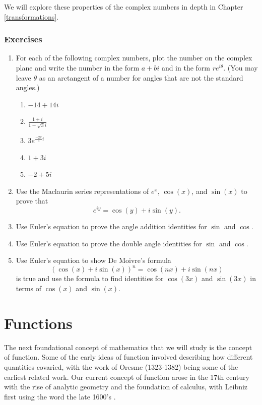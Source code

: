 \documentclass[
]{book}
\theoremstyle{definition}
\theoremstyle{definition}
\theoremstyle{definition}
\theoremstyle{definition}
\theoremstyle{remark}
\begin{document}
We will explore these properties of the complex numbers in depth in Chapter \ref{transformations}.

\hypertarget{exercises-16}{%
\subsection{Exercises}\label{exercises-16}}

\begin{enumerate}
\def\labelenumi{\arabic{enumi}.}
\item
  For each of the following complex numbers, plot the number on the complex plane and write the number in the form \(a+bi\) and in the form \(re^{i\theta}\). (You may leave \(\theta\) as an arctangent of a number for angles that are not the standard angles.)

  \begin{enumerate}
  \def\labelenumii{\alph{enumii}.}
  \item
    \(-14+14i\)
  \item
    \(\displaystyle{\frac{1+i}{1-\sqrt{3}i}}\)
  \item
    \(\displaystyle{3e^{\frac{-2\pi}{3}i}}\)
  \item
    \(1+3i\)
  \item
    \(\displaystyle{\overline{-2+5i}}\)
  \end{enumerate}
\item
  Use the Maclaurin series representations of \(e^x\), \(\cos(x)\), and \(\sin(x)\) to prove that \[e^{iy}=\cos(y) + i \sin(y).\]
\item
  Use Euler's equation to prove the angle addition identities for \(\sin\) and \(\cos\).
\item
  Use Euler's equation to prove the double angle identities for \(\sin\) and \(\cos\).
\item
  Use Euler's equation to show De Moivre's formula
  \[\left(\cos(x) + i \sin(x) \right)^n = \cos(nx) + i\sin(nx) \] is true and use the formula to find identities for \(\cos(3x)\) and \(\sin(3x)\) in terms of \(\cos(x)\) and \(\sin(x)\).
\end{enumerate}

\hypertarget{function}{%
\chapter{Functions}\label{function}}

The next foundational concept of mathematics that we will study is the concept of function. Some of the early ideas of function involved describing how different quantities covaried, with the work of Oresme (1323-1382) being some of the earliest related work. Our current concept of function arose in the 17th century with the rise of analytic geometry and the foundation of calculus, with Leibniz first using the word the late 1600's \citep{Ponte1992}.
\end{document}
